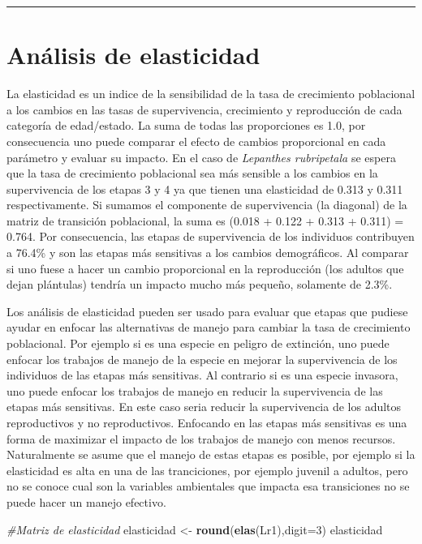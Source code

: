 \documentclass[
]{book}
\newenvironment{Shaded}{\begin{snugshade}}{\end{snugshade}}
\newcommand{\AttributeTok}[1]{\textcolor[rgb]{0.13,0.29,0.53}{#1}}
\newcommand{\CommentTok}[1]{\textcolor[rgb]{0.56,0.35,0.01}{\textit{#1}}}
\newcommand{\DecValTok}[1]{\textcolor[rgb]{0.00,0.00,0.81}{#1}}
\newcommand{\FunctionTok}[1]{\textcolor[rgb]{0.13,0.29,0.53}{\textbf{#1}}}
\newcommand{\NormalTok}[1]{#1}
\newcommand{\OtherTok}[1]{\textcolor[rgb]{0.56,0.35,0.01}{#1}}
\theoremstyle{definition}
\theoremstyle{definition}
\theoremstyle{definition}
\theoremstyle{definition}
\theoremstyle{remark}
\begin{document}
\begin{center}\rule{0.5\linewidth}{0.5pt}\end{center}

\section{Análisis de elasticidad}\label{anuxe1lisis-de-elasticidad}

La elasticidad es un indice de la sensibilidad de la tasa de crecimiento poblacional a los cambios en las tasas de supervivencia, crecimiento y reproducción de cada categoría de edad/estado. La suma de todas las proporciones es 1.0, por consecuencia uno puede comparar el efecto de cambios proporcional en cada parámetro y evaluar su impacto. En el caso de \emph{Lepanthes rubripetala} se espera que la tasa de crecimiento poblacional sea más sensible a los cambios en la supervivencia de los etapas 3 y 4 ya que tienen una elasticidad de 0.313 y 0.311 respectivamente. Si sumamos el componente de supervivencia (la diagonal) de la matriz de transición poblacional, la suma es (0.018 + 0.122 + 0.313 + 0.311) = 0.764. Por consecuencia, las etapas de supervivencia de los individuos contribuyen a 76.4\% y son las etapas más sensitivas a los cambios demográficos. Al comparar si uno fuese a hacer un cambio proporcional en la reproducción (los adultos que dejan plántulas) tendría un impacto mucho más pequeño, solamente de 2.3\%.

Los análisis de elasticidad pueden ser usado para evaluar que etapas que pudiese ayudar en enfocar las alternativas de manejo para cambiar la tasa de crecimiento poblacional. Por ejemplo si es una especie en peligro de extinción, uno puede enfocar los trabajos de manejo de la especie en mejorar la supervivencia de los individuos de las etapas más sensitivas. Al contrario si es una especie invasora, uno puede enfocar los trabajos de manejo en reducir la supervivencia de las etapas más sensitivas. En este caso seria reducir la supervivencia de los adultos reproductivos y no reproductivos. Enfocando en las etapas más sensitivas es una forma de maximizar el impacto de los trabajos de manejo con menos recursos. Naturalmente se asume que el manejo de estas etapas es posible, por ejemplo si la elasticidad es alta en una de las tranciciones, por ejemplo juvenil a adultos, pero no se conoce cual son la variables ambientales que impacta esa transiciones no se puede hacer un manejo efectivo.

\begin{Shaded}
\begin{Highlighting}[]
\CommentTok{\#Matriz de elasticidad}
\NormalTok{elasticidad }\OtherTok{\textless{}{-}} \FunctionTok{round}\NormalTok{(}\FunctionTok{elas}\NormalTok{(Lr1),}\AttributeTok{digit=}\DecValTok{3}\NormalTok{)}
\NormalTok{elasticidad}
\end{Highlighting}
\end{Shaded}
\end{document}
